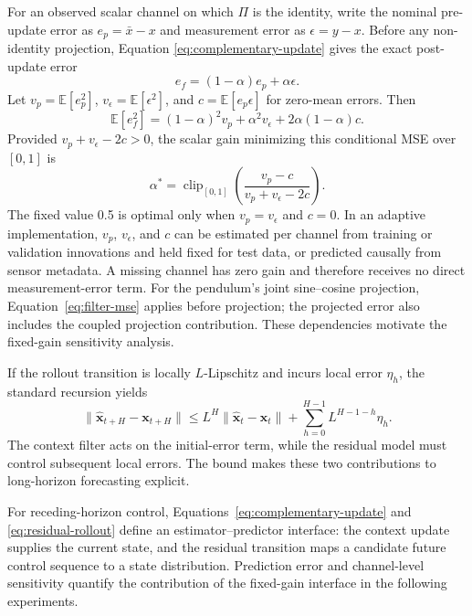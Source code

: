 \documentclass[pdflatex,sn-basic]{sn-jnl}
\newcommand{\vect}[1]{\mathbf{#1}}
\begin{document}
For an observed scalar channel on which $\Pi$ is the identity, write the
nominal pre-update error as $e_p=\bar x-x$ and measurement error as
$\epsilon=y-x$. Before any non-identity projection, Equation
\eqref{eq:complementary-update} gives the exact post-update error
\begin{equation}
 e_f=(1-\alpha)e_p+\alpha\epsilon.
\end{equation}
Let $v_p=\mathbb E[e_p^2]$, $v_\epsilon=\mathbb E[\epsilon^2]$, and
$c=\mathbb E[e_p\epsilon]$ for zero-mean errors. Then
\begin{equation}
 \mathbb E[e_f^2]=(1-\alpha)^2v_p+\alpha^2v_\epsilon
 +2\alpha(1-\alpha)c.
 \label{eq:filter-mse}
\end{equation}
Provided $v_p+v_\epsilon-2c>0$, the scalar gain minimizing this conditional MSE
over $[0,1]$ is
\begin{equation}
 \alpha^*=\operatorname{clip}_{[0,1]}
 \left(\frac{v_p-c}{v_p+v_\epsilon-2c}\right).
 \label{eq:optimal-gain}
\end{equation}
The fixed value 0.5 is optimal only when $v_p=v_\epsilon$ and $c=0$. In an
adaptive implementation, $v_p$, $v_\epsilon$, and $c$ can be estimated per
channel from training or validation innovations and held fixed for test data,
or predicted causally from sensor metadata. A missing channel has zero gain and
therefore receives no direct measurement-error term. For the pendulum's joint sine--cosine projection,
Equation~\eqref{eq:filter-mse} applies before projection; the projected error
also includes the coupled projection contribution. These dependencies motivate
the fixed-gain sensitivity analysis.

If the rollout transition is locally $L$-Lipschitz and incurs local error
$\eta_h$, the standard recursion yields
\begin{equation}
 \|\hat{\vect x}_{t+H}-\vect x_{t+H}\|
 \le L^H\|\hat{\vect x}_t-\vect x_t\|
 +\sum_{h=0}^{H-1}L^{H-1-h}\eta_h.
\end{equation}
The context filter acts on the initial-error term, while the residual model
must control subsequent local errors. The bound makes these two contributions
to long-horizon forecasting explicit.

For receding-horizon control, Equations~\eqref{eq:complementary-update} and
\eqref{eq:residual-rollout} define an estimator--predictor interface: the
context update supplies the current state, and the residual transition maps a
candidate future control sequence to a state distribution. Prediction error
and channel-level sensitivity quantify the contribution of the fixed-gain
interface in the following experiments.
\end{document}
